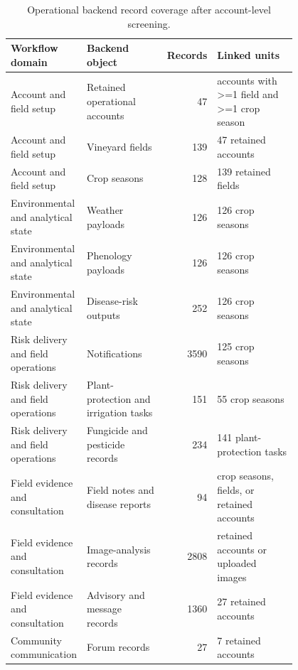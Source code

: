 \begin{table}[htbp]
\centering
\small
\caption{Operational backend record coverage after account-level screening.}
\label{tab:backend_operational_coverage}
\begin{tabular}{p{0.25\linewidth} p{0.27\linewidth} r p{0.28\linewidth}}
\toprule
Workflow domain & Backend object & Records & Linked units \\
\midrule
Account and field setup & Retained operational accounts & 47 & accounts with >=1 field and >=1 crop season \\
Account and field setup & Vineyard fields & 139 & 47 retained accounts \\
Account and field setup & Crop seasons & 128 & 139 retained fields \\
Environmental and analytical state & Weather payloads & 126 & 126 crop seasons \\
Environmental and analytical state & Phenology payloads & 126 & 126 crop seasons \\
Environmental and analytical state & Disease-risk outputs & 252 & 126 crop seasons \\
Risk delivery and field operations & Notifications & 3590 & 125 crop seasons \\
Risk delivery and field operations & Plant-protection and irrigation tasks & 151 & 55 crop seasons \\
Risk delivery and field operations & Fungicide and pesticide records & 234 & 141 plant-protection tasks \\
Field evidence and consultation & Field notes and disease reports & 94 & crop seasons, fields, or retained accounts \\
Field evidence and consultation & Image-analysis records & 2808 & retained accounts or uploaded images \\
Field evidence and consultation & Advisory and message records & 1360 & 27 retained accounts \\
Community communication & Forum records & 27 & 7 retained accounts \\
\bottomrule
\end{tabular}
\end{table}

